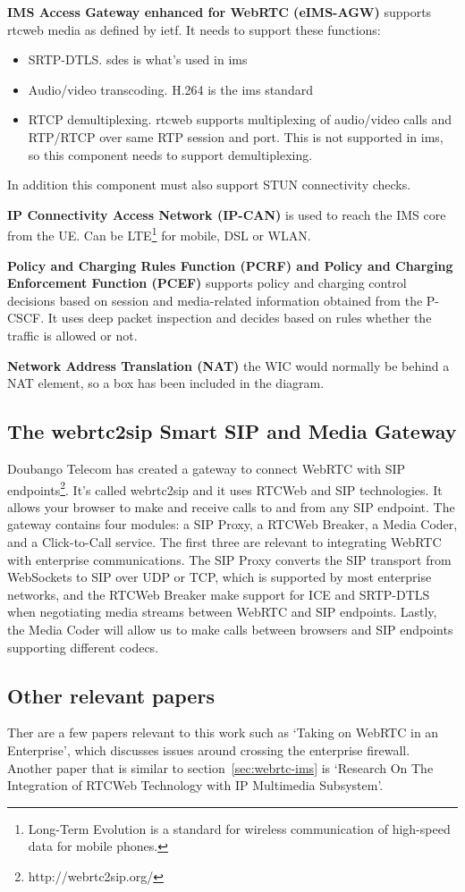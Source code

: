 \textbf{IMS Access Gateway enhanced for WebRTC (eIMS-AGW)}
supports \gls{rtcweb} media as defined by \gls{ietf}. It needs to support these functions:
\begin{itemize}
\item{SRTP-DTLS. \gls{sdes} is what's used in \gls{ims}}
\item{Audio/video transcoding. H.264 is the \gls{ims} standard}
\item{RTCP demultiplexing. \gls{rtcweb} supports multiplexing of audio/video calls and RTP/RTCP over same RTP session and port. This is not supported in \gls{ims}, so this component needs to support demultiplexing.}
\end{itemize}

In addition this component must also support STUN connectivity checks.

\textbf{IP Connectivity Access Network (IP-CAN)}
is used to reach the IMS core from the UE. Can be LTE\footnote{Long-Term Evolution is a standard for wireless communication of high-speed data for mobile phones.} for mobile, DSL or WLAN.

\textbf{Policy and Charging Rules Function (PCRF) and Policy and Charging Enforcement Function (PCEF)}
supports policy and charging control decisions based on session and media-related information obtained from the P-CSCF. It uses deep packet inspection and decides based on rules whether the traffic is allowed or not.

\textbf{Network Address Translation (NAT)}
the WIC would normally be behind a NAT element, so a box has been included in the diagram.

\subsection{The webrtc2sip Smart SIP and Media Gateway}
\label{sec:webrtc2sip}
Doubango Telecom has created a gateway to connect WebRTC with SIP endpoints\footnote{http://webrtc2sip.org/}. It's called webrtc2sip and it uses RTCWeb and SIP technologies. It allows your browser to make and receive calls to and from any SIP endpoint. The gateway contains four modules: a SIP Proxy, a RTCWeb Breaker, a Media Coder, and a Click-to-Call service. The first three are relevant to integrating WebRTC with enterprise communications. The SIP Proxy converts the SIP transport from WebSockets to SIP over UDP or TCP, which is supported by most enterprise networks, and the RTCWeb Breaker make support for ICE and SRTP-DTLS when negotiating media streams between WebRTC and SIP endpoints. Lastly, the Media Coder will allow us to make calls between browsers and SIP endpoints supporting different codecs.


\subsection{Other relevant papers}
Ther are a few papers relevant to this work such as `Taking on WebRTC in an Enterprise\cite{johnston_taking_2013}', which discusses issues around crossing the enterprise firewall. Another paper that is similar to section~\ref{sec:webrtc-ims} is `Research On The Integration of RTCWeb Technology with IP Multimedia Subsystem\cite{li2012research}'.
